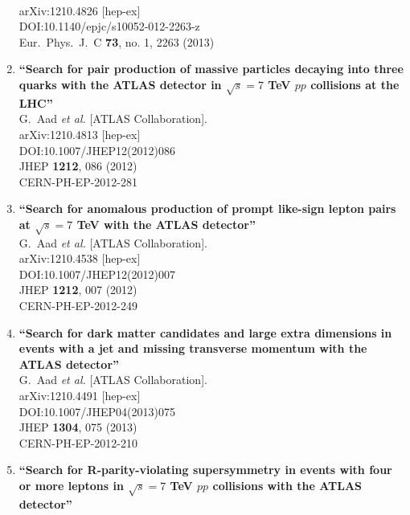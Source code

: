 \documentclass{article}
\begin{document}
\begin{enumerate}
  \\{}arXiv:1210.4826 [hep-ex]
  \\{}DOI:10.1140/epjc/s10052-012-2263-z
  \\{}Eur.\ Phys.\ J.\ C {\bf 73}, no. 1, 2263 (2013)
\item%
{\bf ``Search for pair production of massive particles decaying into three quarks with the ATLAS detector in $\sqrt{s}=7$ TeV $pp$ collisions at the LHC''}
  \\{}G.~Aad {\it et al.} [ATLAS Collaboration].
  \\{}arXiv:1210.4813 [hep-ex]
  \\{}DOI:10.1007/JHEP12(2012)086
  \\{}JHEP {\bf 1212}, 086 (2012)
  \\{}CERN-PH-EP-2012-281
\item%
{\bf ``Search for anomalous production of prompt like-sign lepton pairs at $\sqrt{s}=7$ TeV with the ATLAS detector''}
  \\{}G.~Aad {\it et al.} [ATLAS Collaboration].
  \\{}arXiv:1210.4538 [hep-ex]
  \\{}DOI:10.1007/JHEP12(2012)007
  \\{}JHEP {\bf 1212}, 007 (2012)
  \\{}CERN-PH-EP-2012-249
\item%
{\bf ``Search for dark matter candidates and large extra dimensions in events with a jet and missing transverse momentum with the ATLAS detector''}
  \\{}G.~Aad {\it et al.} [ATLAS Collaboration].
  \\{}arXiv:1210.4491 [hep-ex]
  \\{}DOI:10.1007/JHEP04(2013)075
  \\{}JHEP {\bf 1304}, 075 (2013)
  \\{}CERN-PH-EP-2012-210
\item%
{\bf ``Search for R-parity-violating supersymmetry in events with four or more leptons in $\sqrt{s}=7$ TeV $pp$ collisions with the ATLAS detector''}

\end{enumerate}
\end{document}
